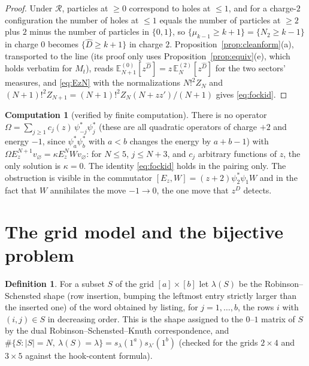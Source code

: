 \documentclass[11pt]{article}
\theoremstyle{definition}
\newtheorem{definition}[theorem]{Definition}
\newtheorem{computation}[theorem]{Computation}
\theoremstyle{remark}
\newcommand{\E}{\mathbb{E}}
\newcommand{\ket}[1]{v_{#1}}
\begin{document}
\begin{proof}
Under $\mathcal R$, particles at $\ge0$ correspond to holes at $\le1$, and for a charge-$2$ configuration the number of holes at $\le1$ equals the number of particles at $\ge2$ plus $2$ minus the number of particles in $\{0,1\}$, so $\{\mu_{k-1}\ge k+1\}=\{N_2\ge k-1\}$ in charge $0$ becomes $\{\hat D\ge k+1\}$ in charge $2$. Proposition~\ref{prop:cleanform}(a), transported to the line (its proof only uses Proposition~\ref{prop:equiv}(e), which holds verbatim for $M_t$), reads $\E^{(0)}_{N+1}[z^{\hat D}]=z\,\E^{(2)}_N[z^{\hat D}]$ for the two sectors' measures, and \eqref{eq:EzN} with the normalizations $N!^2Z_N$ and $(N+1)!^2Z_{N+1}=(N+1)!^2Z_N(N+zz')/(N+1)$ gives \eqref{eq:fockid}.
\end{proof}

\begin{computation}[verified by finite computation]
There is no operator $\Omega=\sum_{j\ge1}c_j(z)\,\psi^*_{-j}\psi^*_j$ (these are all quadratic operators of charge $+2$ and energy $-1$, since $\psi^*_a\psi^*_b$ with $a<b$ changes the energy by $a+b-1$) with $\Omega E_z^{N+1}\ket\varnothing=\kappa E_z^NW\ket\varnothing$: for $N\le5$, $j\le N+3$, and $c_j$ arbitrary functions of $z$, the only solution is $\kappa=0$. The identity \eqref{eq:fockid} holds in the pairing only. The obstruction is visible in the commutator $[E_z,W]=(z+2)\psi^*_2\psi_1W$ and in the fact that $W$ annihilates the move $-1\to0$, the one move that $z^{\hat D}$ detects.
\end{computation}

\section{The grid model and the bijective problem}\label{sec:grid}

\begin{definition}
For a subset $S$ of the grid $[a]\times[b]$ let $\lambda(S)$ be the Robinson--Schensted shape (row insertion, bumping the leftmost entry strictly larger than the inserted one) of the word obtained by listing, for $j=1,\dots,b$, the rows $i$ with $(i,j)\in S$ in decreasing order. This is the shape assigned to the $0$--$1$ matrix of $S$ by the dual Robinson--Schensted--Knuth correspondence, and $\#\{S:|S|=N,\ \lambda(S)=\lambda\}=s_\lambda(1^a)s_{\lambda'}(1^b)$ (checked for the grids $2\times4$ and $3\times5$ against the hook-content formula).
\end{definition}
\end{document}
